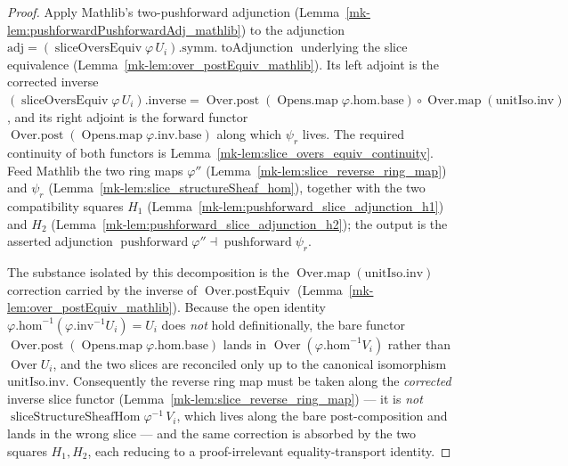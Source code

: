 \begin{proof}
  \leanok
    Apply Mathlib's two-pushforward adjunction (Lemma~\ref{mk-lem:pushforwardPushforwardAdj_mathlib}) to the
  adjunction \(\mathrm{adj} = (\operatorname{sliceOversEquiv}\varphi\,U_i).\mathrm{symm}.
  \operatorname{toAdjunction}\) underlying the slice equivalence
  (Lemma~\ref{mk-lem:over_postEquiv_mathlib}). Its left adjoint is the corrected inverse
  \((\operatorname{sliceOversEquiv}\varphi\,U_i).\mathrm{inverse} =
  \operatorname{Over.post}(\operatorname{Opens.map}\varphi.\mathrm{hom}.\mathrm{base}) \circ
  \operatorname{Over.map}(\mathrm{unitIso}.\mathrm{inv})\), and its right adjoint is the forward functor
  \(\operatorname{Over.post}(\operatorname{Opens.map}\varphi.\mathrm{inv}.\mathrm{base})\) along which
  \(\psi_r\) lives. The required continuity of both functors is
  Lemma~\ref{mk-lem:slice_overs_equiv_continuity}. Feed Mathlib the two ring maps \(\varphi''\)
  (Lemma~\ref{mk-lem:slice_reverse_ring_map}) and \(\psi_r\) (Lemma~\ref{mk-lem:slice_structureSheaf_hom}),
  together with the two compatibility squares \(H_1\) (Lemma~\ref{mk-lem:pushforward_slice_adjunction_h1})
  and \(H_2\) (Lemma~\ref{mk-lem:pushforward_slice_adjunction_h2}); the output is the asserted adjunction
  \(\operatorname{pushforward}\varphi'' \dashv \operatorname{pushforward}\psi_r\).

  The substance isolated by this decomposition is the
  \(\operatorname{Over.map}(\mathrm{unitIso}.\mathrm{inv})\) correction carried by the inverse of
  \(\operatorname{Over.postEquiv}\) (Lemma~\ref{mk-lem:over_postEquiv_mathlib}). Because the open identity
  \(\varphi.\mathrm{hom}^{-1}(\varphi.\mathrm{inv}^{-1} U_i) = U_i\) does \emph{not} hold
  definitionally, the bare functor
  \(\operatorname{Over.post}(\operatorname{Opens.map}\varphi.\mathrm{hom}.\mathrm{base})\) lands in
  \(\operatorname{Over}(\varphi.\mathrm{hom}^{-1} V_i)\) rather than \(\operatorname{Over} U_i\), and the
  two slices are reconciled only up to the canonical isomorphism \(\mathrm{unitIso}.\mathrm{inv}\).
  Consequently the reverse ring map must be taken along the \emph{corrected} inverse slice functor
  (Lemma~\ref{mk-lem:slice_reverse_ring_map}) --- it is \emph{not}
  \(\operatorname{sliceStructureSheafHom}\varphi^{-1}\,V_i\), which lives along the bare post-composition
  and lands in the wrong slice --- and the same correction is absorbed by the two squares \(H_1, H_2\),
  each reducing to a proof-irrelevant equality-transport identity.
\end{proof}

